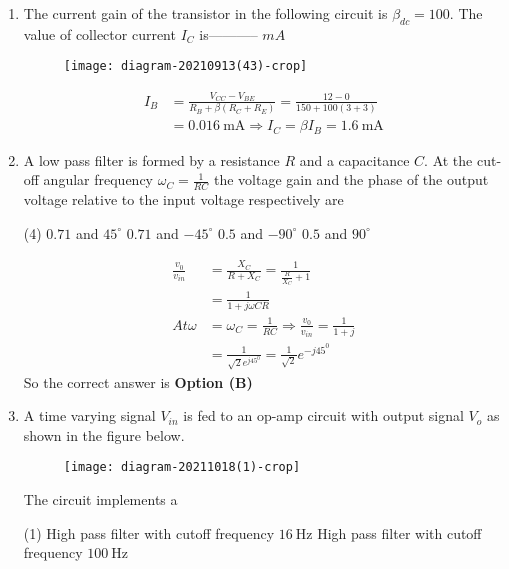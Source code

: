 \begin{enumerate}
	\item The current gain of the transistor in the following circuit is $\beta_{d c}=100$. The value of collector current $I_{C}$ is----------- $m A$
\begin{figure}[H]
\centering
\texttt{[image: diagram-20210913(43)-crop]}
\end{figure}
\begin{answer}
\begin{align*}
I_{B}&=\frac{V_{C C}-V_{B E}}{R_{B}+\beta\left(R_{C}+R_{E}\right)}=\frac{12-0}{150+100(3+3)}\\&=0.016 \mathrm{~mA} \Rightarrow I_{C}=\beta I_{B}=1.6 \mathrm{~mA}
\end{align*}
\end{answer}
	\item A low pass filter is formed by a resistance $R$ and a capacitance $C .$ At the cut-off angular frequency $\omega_{C}=\frac{1}{R C}$ the voltage gain and the phase of the output voltage relative to the input voltage respectively are
\begin{tasks}(4)
\task[\textbf{A.}] $0.71$ and $45^{\circ}$
\task[\textbf{B.}]  $0.71$ and $-45^{\circ}$
\task[\textbf{C.}] $0.5$ and $-90^{\circ}$
\task[\textbf{D.}] $0.5$ and $90^{\circ}$
\end{tasks}
\begin{answer}
\begin{align*}
\frac{v_{0}}{v_{i n}}&=\frac{X_{C}}{R+X_{C}}=\frac{1}{\frac{R}{X_{C}}+1}\\&=\frac{1}{1+j \omega C R}\\
At \omega&=\omega_{C}=\frac{1}{R C} \Rightarrow \frac{v_{0}}{v_{i n}}=\frac{1}{1+j}\\&=\frac{1}{\sqrt{2} e^{j 45^{0}}}=\frac{1}{\sqrt{2}} e^{-j 45^{0}}
\end{align*}
So the correct answer is \textbf{Option (B)}
\end{answer}
	\item A time varying signal $V_{i n}$ is fed to an op-amp circuit with output signal $V_{o}$ as shown in the figure below.\\
	\begin{figure}[H]
		\centering
		\texttt{[image: diagram-20211018(1)-crop]}
	\end{figure}
	The circuit implements a
\begin{tasks}(1)
\task[\textbf{A.}] High pass filter with cutoff frequency $16 \mathrm{~Hz}$
\task[\textbf{B.}] High pass filter with cutoff frequency $100 \mathrm{~Hz}$

\end{tasks}
\end{enumerate}
